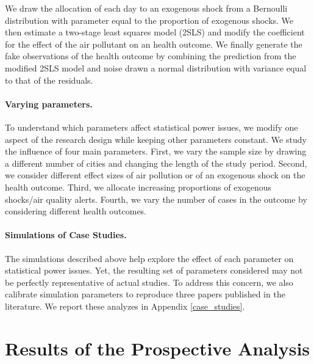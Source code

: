 \documentclass[12pt]{article}
\begin{document}
        \noindent We draw the allocation of each day to an exogenous shock from a Bernoulli distribution with parameter equal to the proportion of exogenous shocks. We then estimate a two-stage least squares model (2SLS) and modify the coefficient for the effect of the air pollutant on an health outcome. We finally generate the fake observations of the health outcome by combining the prediction from the modified 2SLS model and noise drawn a normal distribution with variance equal to that of the residuals.
        
        \paragraph{Varying parameters.} To understand which parameters affect statistical power issues, we modify one aspect of the research design while keeping other parameters constant. We study the influence of four main parameters. First, we vary the sample size by drawing a different number of cities and changing the length of the study period. Second, we consider different effect sizes of air pollution or of an exogenous shock on the health outcome. Third, we allocate increasing proportions of exogenous shocks/air quality alerts. Fourth, we vary the number of cases in the outcome by considering different health outcomes.

        \paragraph{Simulations of Case Studies.} The simulations described above help explore the effect of each parameter on statistical power issues. Yet, the resulting set of parameters considered may not be perfectly representative of actual studies. To address this concern, we also calibrate simulation parameters to reproduce three papers published in the literature. We report these analyzes in Appendix \ref{case_studies}.




\section{Results of the Prospective Analysis}\label{section_results}
\end{document}
